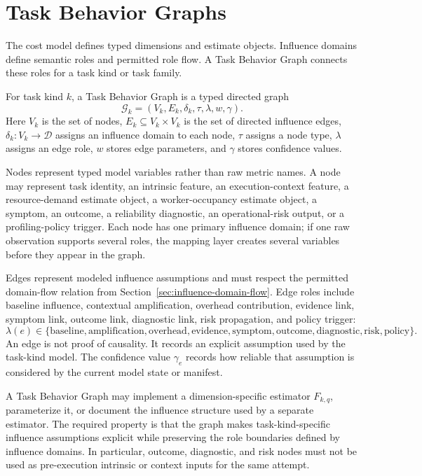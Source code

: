 \section{Task Behavior Graphs}
\label{sec:task-behavior-graphs}

The cost model defines typed dimensions and estimate objects. Influence domains
define semantic roles and permitted role flow. A Task Behavior Graph connects
these roles for a task kind or task family.

For task kind $k$, a Task Behavior Graph is a typed directed graph
\[
\mathcal{G}_k
=
\left(
V_k,
E_k,
\delta_k,
\tau,
\lambda,
w,
\gamma
\right).
\]
Here $V_k$ is the set of nodes, $E_k\subseteq V_k\times V_k$ is the set of
directed influence edges, $\delta_k:V_k\rightarrow\mathcal{D}$ assigns an
influence domain to each node, $\tau$ assigns a node type, $\lambda$ assigns an
edge role, $w$ stores edge parameters, and $\gamma$ stores confidence values.

Nodes represent typed model variables rather than raw metric names. A node may
represent task identity, an intrinsic feature, an execution-context feature, a
resource-demand estimate object, a worker-occupancy estimate object, a symptom,
an outcome, a reliability diagnostic, an operational-risk output, or a
profiling-policy trigger. Each node has one primary influence domain; if one raw
observation supports several roles, the mapping layer creates several variables
before they appear in the graph.

Edges represent modeled influence assumptions and must respect the permitted
domain-flow relation from Section~\ref{sec:influence-domain-flow}. Edge roles
include baseline influence, contextual amplification, overhead contribution,
evidence link, symptom link, outcome link, diagnostic link, risk propagation,
and policy trigger:
\[
\lambda(e)
\in
\{
\mathrm{baseline},
\mathrm{amplification},
\mathrm{overhead},
\mathrm{evidence},
\mathrm{symptom},
\mathrm{outcome},
\mathrm{diagnostic},
\mathrm{risk},
\mathrm{policy}
\}.
\]
An edge is not proof of causality. It records an explicit assumption used by the
task-kind model. The confidence value $\gamma_e$ records how reliable that
assumption is considered by the current model state or manifest.

A Task Behavior Graph may implement a dimension-specific estimator $F_{k,q}$,
parameterize it, or document the influence structure used by a separate
estimator. The required property is that the graph makes task-kind-specific
influence assumptions explicit while preserving the role boundaries defined by
influence domains. In particular, outcome, diagnostic, and risk nodes must not be
used as pre-execution intrinsic or context inputs for the same attempt.

